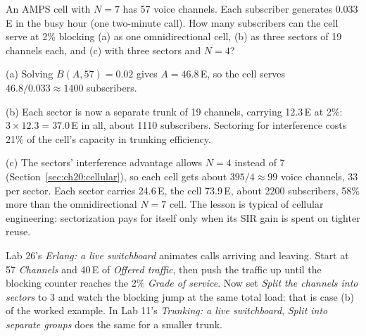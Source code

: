 \begin{worked}
An AMPS cell with $N=7$ has 57 voice channels. Each subscriber generates 0.033\,E in the busy hour (one two-minute
call). How many subscribers can the cell serve at 2\% blocking (a) as one omnidirectional cell, (b) as three
sectors of 19 channels each, and (c) with three sectors and $N=4$?

(a) Solving $B(A,57)=0.02$ gives $A=46.8$\,E, so the cell serves $46.8/0.033\approx1400$ subscribers.

(b) Each sector is now a separate trunk of 19 channels, carrying 12.3\,E at 2\%: $3\times12.3=37.0$\,E in all,
about 1110 subscribers. Sectoring for interference costs 21\% of the cell's capacity in trunking efficiency.

(c) The sectors' interference advantage allows $N=4$ instead of 7 (Section~\ref{sec:ch20:cellular}), so each cell
gets about $395/4\approx99$ voice channels, 33 per sector. Each sector carries 24.6\,E, the cell 73.9\,E, about 2200
subscribers, 58\% more than the omnidirectional $N=7$ cell. The lesson is typical of cellular engineering:
sectorization pays for itself only when its SIR gain is spent on tighter reuse.
\end{worked}

\begin{tryit}
Lab 26's \emph{Erlang: a live switchboard} animates calls arriving and leaving. Start at 57 \emph{Channels} and
40\,E of \emph{Offered traffic}, then push the traffic up until the blocking counter reaches the 2\%
\emph{Grade of service}. Now set \emph{Split the channels into sectors} to 3 and watch the blocking jump at the
same total load: that is case (b) of the worked example. In Lab 11's \emph{Trunking: a live switchboard},
\emph{Split into separate groups} does the same for a smaller trunk.
\end{tryit}

